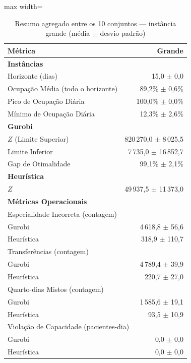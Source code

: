 \begin{table}[htbp]
    \caption{Resumo agregado entre os 10 conjuntos --- instância grande (média $\pm$ desvio padrão)}
    \label{tab:agregado-grande}
    \centering
    \begin{adjustbox}{max width=\textwidth}
    \begin{tabular}{lr}
        \hline
        \textbf{Métrica} & \textbf{Grande} \\
        \hline
        \multicolumn{2}{l}{\textbf{Instâncias}} \\
        Horizonte (dias) & 15,0 $\pm$ 0,0 \\
        Ocupação Média (todo o horizonte) & 89,2\% $\pm$ 0,6\% \\
        Pico de Ocupação Diária & 100,0\% $\pm$ 0,0\% \\
        Mínimo de Ocupação Diária & 12,3\% $\pm$ 2,6\% \\
        \hline
        \multicolumn{2}{l}{\textbf{Gurobi}} \\
        $Z$ (Limite Superior) & 820\,270,0 $\pm$ 8\,025,5 \\
        Limite Inferior & 7\,735,0 $\pm$ 16\,852,7 \\
        Gap de Otimalidade & 99,1\% $\pm$ 2,1\% \\
        \hline
        \multicolumn{2}{l}{\textbf{Heurística}} \\
        $Z$ & 49\,937,5 $\pm$ 11\,373,0 \\
        \hline
        \multicolumn{2}{l}{\textbf{Métricas Operacionais}} \\
        \multicolumn{2}{l}{Especialidade Incorreta (contagem)} \\
        \quad Gurobi & 4\,618,8 $\pm$ 56,6 \\
        \quad Heurística & 318,9 $\pm$ 110,7 \\
        \multicolumn{2}{l}{Transferências (contagem)} \\
        \quad Gurobi & 4\,789,4 $\pm$ 39,9 \\
        \quad Heurística & 220,7 $\pm$ 27,0 \\
        \multicolumn{2}{l}{Quarto-dias Mistos (contagem)} \\
        \quad Gurobi & 1\,585,6 $\pm$ 19,1 \\
        \quad Heurística & 93,5 $\pm$ 10,9 \\
        \multicolumn{2}{l}{Violação de Capacidade (pacientes-dia)} \\
        \quad Gurobi & 0,0 $\pm$ 0,0 \\
        \quad Heurística & 0,0 $\pm$ 0,0 \\
        \hline
    \end{tabular}
    \end{adjustbox}
\end{table}

